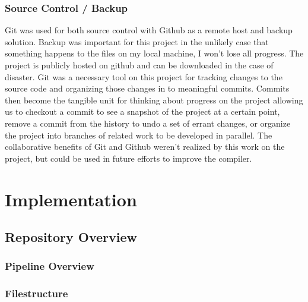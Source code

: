 \documentclass[12pt,a4paper,twoside,openright]{report}
\begin{document}
\subsection{Source Control / Backup}
Git was used for both source control with Github as a remote host and backup solution.
Backup was important for this project in the unlikely case that something happens to the files on my local machine, I won't lose all progress.
The project is publicly hosted on github and can be downloaded in the case of disaster.
Git was a necessary tool on this project for tracking changes to the source code and organizing those changes in to meaningful commits.
Commits then become the tangible unit for thinking about progress on the project allowing us to checkout a commit to see a snapshot of the project at a certain point, remove a commit from the history to undo a set of errant changes, or organize the project into branches of related work to be developed in parallel.
The collaborative benefits of Git and Github weren't realized by this work on the project, but could be used in future efforts to improve the compiler.

\chapter{Implementation}

\section{Repository Overview}
\subsection{Pipeline Overview}
\subsection{Filestructure}
\end{document}
